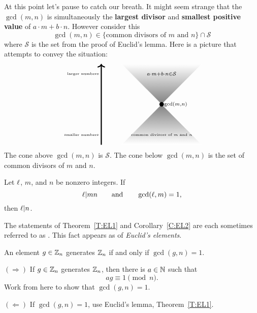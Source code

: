 \documentclass{ximera}
\begin{document}
At this point let's pause to catch our breath. It might seem strange
that the $\gcd(m,n)$ is simultaneously the \textbf{largest divisor} and
\textbf{smallest positive value} of $a\cdot m + b\cdot n$. However
consider this
\[
\gcd(m,n) \in \{\text{common divisors of $m$ and $n$}\}\cap \mathcal{S}
\]
where $\mathcal{S}$ is the set from the proof of Euclid's
lemma. Here is a picture that attempts to convey the situation:
\[
\begin{tikzpicture}
  \draw[white,thin,shading = axis, top color = white, bottom color = gray] (-2,2) -- (0,0)-- (2,2) -- (-2,2) -- cycle;
  \draw[white,thin,shading = axis, bottom color = white, top color = gray] (-2,-2) -- (0,0)-- (2,-2) -- (-2,-2) -- cycle;
  \filldraw (0,0) circle (3pt);
  \node[right] at (0,0) {$\scriptstyle\gcd(m,n)$};
  \node at (0,1.5) {$\scriptstyle a\cdot m + b\cdot n\in\mathcal{S}$};
  \node at (0,-1.5) {\text{\tiny common divisors of $m$ and $n$}};
  \draw[->,ultra thick] (-3,-2) -- (-3,2);
  \node[left] at (-3,-1.5) {\text{\tiny smaller numbers}};
  \node[left] at (-3,1.5) {\text{\tiny larger numbers}};
\end{tikzpicture}
\]
The cone above $\gcd(m,n)$ is $\mathcal{S}$. The cone below
$\gcd(m,n)$ is the set of common divisors of $m$ and $n$.




\begin{corollary}\label{C:EL2}
  Let $\ell$, $m$, and $n$ be nonzero integers. If
  \[
  \ell|mn\qquad\text{and}\qquad \gcd(\ell,m)=1,
  \]
  then $\ell|n$. 
\end{corollary}


The statements of Theorem~\ref{T:EL1} and Corollary~\ref{C:EL2} are
each sometimes referred to as . This fact appears as  of
\textit{Euclid's elements}.



\begin{corollary}
  An element $g\in \mathbb Z_n$ generates $\mathbb Z_n$ if and only if $\gcd(g,n) =
  1$.
  \begin{sketch}
    $(\Rightarrow)$ If $g\in\mathbb Z_n$ generates $\mathbb Z_n$, then there is
    $a\in\mathbb N$ such that
    \[
    ag \equiv 1\pmod{n}.
    \]
    Work from here to show that $\gcd(g,n) = 1$.
    

    $(\Leftarrow)$ If $\gcd(g,n) = 1$, use Euclid's lemma,
    Theorem~\ref{T:EL1}.
  \end{sketch}
\end{corollary}
\end{document}
